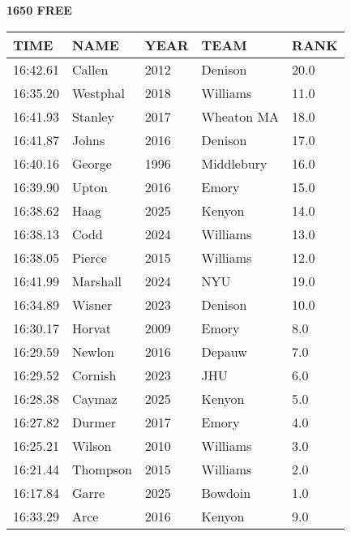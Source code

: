\begin{minipage}[t]{0.48\textwidth}
\centering
\textbf{1650 FREE}\\[0.05cm]
\begin{tabular}{@{}p{1.8cm}p{2.8cm}p{1.2cm}p{1.4cm}p{0.8cm}@{}}
\hline
\textbf{TIME} & \textbf{NAME} & \textbf{YEAR} & \textbf{TEAM} & \textbf{RANK} \\
\hline
16:42.61 & Callen & 2012 & Denison & 20.0 \\
16:35.20 & Westphal & 2018 & Williams & 11.0 \\
16:41.93 & Stanley & 2017 & Wheaton MA & 18.0 \\
16:41.87 & Johns & 2016 & Denison & 17.0 \\
16:40.16 & George & 1996 & Middlebury & 16.0 \\
16:39.90 & Upton & 2016 & Emory & 15.0 \\
16:38.62 & Haag & 2025 & Kenyon & 14.0 \\
16:38.13 & Codd & 2024 & Williams & 13.0 \\
16:38.05 & Pierce & 2015 & Williams & 12.0 \\
16:41.99 & Marshall & 2024 & NYU & 19.0 \\
16:34.89 & Wisner & 2023 & Denison & 10.0 \\
16:30.17 & Horvat & 2009 & Emory & 8.0 \\
16:29.59 & Newlon & 2016 & Depauw & 7.0 \\
16:29.52 & Cornish & 2023 & JHU & 6.0 \\
16:28.38 & Caymaz & 2025 & Kenyon & 5.0 \\
16:27.82 & Durmer & 2017 & Emory & 4.0 \\
16:25.21 & Wilson & 2010 & Williams & 3.0 \\
16:21.44 & Thompson & 2015 & Williams & 2.0 \\
16:17.84 & Garre & 2025 & Bowdoin & 1.0 \\
16:33.29 & Arce & 2016 & Kenyon & 9.0 \\
\hline
\end{tabular}
\end{minipage}\hfill
